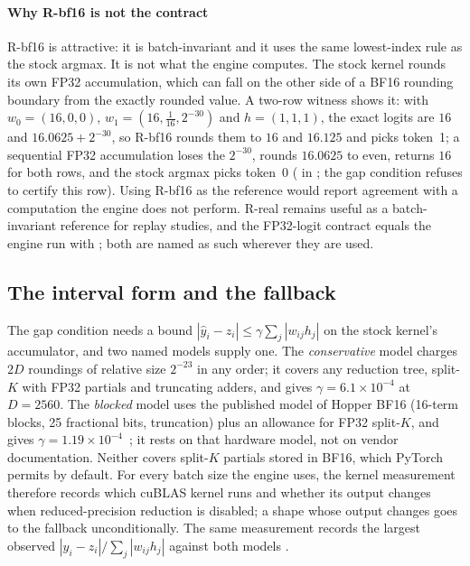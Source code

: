 \paragraph{Why R-bf16 is not the contract} R-bf16 is attractive: it is batch-invariant and it uses the same lowest-index rule as the stock argmax. It is not what the engine computes. The stock kernel rounds its own FP32 accumulation, which can fall on the other side of a BF16 rounding boundary from the exactly rounded value. A two-row witness shows it: with $w_0=(16,0,0)$, $w_1=(16,\tfrac1{16},2^{-30})$ and $h=(1,1,1)$, the exact logits are $16$ and $16.0625+2^{-30}$, so R-bf16 rounds them to $16$ and $16.125$ and picks token~1; a sequential FP32 accumulation loses the $2^{-30}$, rounds $16.0625$ to even, returns $16$ for both rows, and the stock argmax picks token~0 ( in ; the gap condition refuses to certify this row). Using R-bf16 as the reference would report agreement with a computation the engine does not perform. R-real remains useful as a batch-invariant reference for replay studies, and the FP32-logit contract equals the engine run with ; both are named as such wherever they are used.

\subsection{The interval form and the fallback}\label{sec:kernel-fallback}
The gap condition needs a bound $|\hat y_i-z_i|\le\gamma\sum_j|w_{ij}h_j|$ on the stock kernel's accumulator, and two named models supply one. The \emph{conservative} model charges $2D$ roundings of relative size $2^{-23}$ in any order; it covers any reduction tree, split-$K$ with FP32 partials and truncating adders, and gives $\gamma=6.1\times10^{-4}$ at $D=2560$. The \emph{blocked} model uses the published model of Hopper BF16  (16-term blocks, 25 fractional bits, truncation) plus an allowance for FP32 split-$K$, and gives $\gamma=1.19\times10^{-4}$~\cite{khattak2026}; it rests on that hardware model, not on vendor documentation. Neither covers split-$K$ partials stored in BF16, which PyTorch permits by default. For every batch size the engine uses, the kernel measurement therefore records which cuBLAS kernel runs and whether its output changes when reduced-precision reduction is disabled; a shape whose output changes goes to the fallback unconditionally. The same measurement records the largest observed $|\hat y_i-z_i|/\sum_j|w_{ij}h_j|$ against both models .

